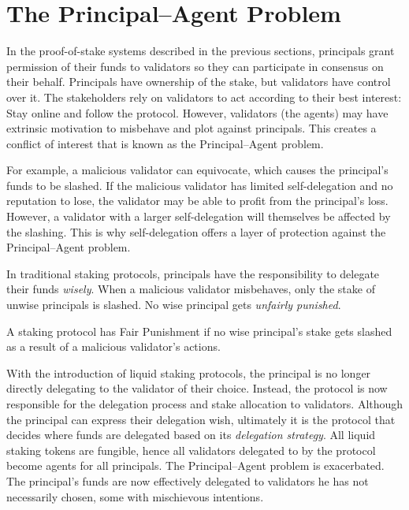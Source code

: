 \section{The Principal--Agent Problem}
In the proof-of-stake systems described in the previous sections,
principals grant permission of their funds to validators so they can
participate in consensus on their behalf.
Principals have ownership of the stake, but
validators have control over it.
The stakeholders rely on validators to act according to their
best interest: Stay online and follow the protocol.
However, validators (the agents) may have extrinsic motivation to
misbehave and plot against principals. This creates
a conflict of interest that is known as the Principal--Agent problem.

For example, a malicious validator can equivocate, which causes
the principal's funds to be slashed. If the malicious validator has
limited self-delegation and no reputation to lose, the validator
may be able to profit from the principal's loss. However, a validator
with a larger self-delegation will themselves be affected by the slashing.
This is why self-delegation offers a layer of protection
against the Principal--Agent problem.

In traditional staking protocols, principals have the responsibility to
delegate their funds \emph{wisely}.
When a malicious validator misbehaves, only the stake of unwise principals is
slashed. No wise principal gets \emph{unfairly punished}.

\begin{definition}
    A staking protocol has Fair Punishment if no wise principal's
    stake gets slashed as a result of a malicious validator's actions.
\end{definition}

With the introduction of liquid staking protocols, the principal
is no longer directly delegating to the validator of their choice.
Instead, the protocol is now responsible for the delegation process
and stake allocation to validators.
Although the principal can express their delegation wish, ultimately
it is the protocol that decides where funds are delegated based on its
\emph{delegation strategy}. All liquid staking tokens are fungible,
hence all validators delegated to by
the protocol become agents for all principals.
The Principal--Agent problem is exacerbated.
The principal's funds are now effectively delegated to validators
he has not necessarily chosen, some with mischievous intentions.
